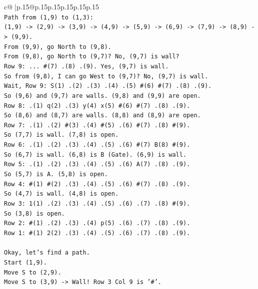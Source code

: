 \documentclass{article}
\begin{document}
{\begin{supertabular}{c@{$\;$}|p{.15\linewidth}@{}p{.15\linewidth}p{.15\linewidth}p{.15\linewidth}p{.15\linewidth}p{.15\linewidth}}
{{{\\ 
\texttt{Path from (1,9) to (1,3):} \\
\texttt{(1,9) {-}> (2,9) {-}> (3,9) {-}> (4,9) {-}> (5,9) {-}> (6,9) {-}> (7,9) {-}> (8,9) {-}> (9,9).} \\
\texttt{From (9,9), go North to (9,8).} \\
\texttt{From (9,8), go North to (9,7)? No, (9,7) is wall?} \\
\texttt{Row 9: ... \#(7) .(8) .(9). Yes, (9,7) is wall.} \\
\texttt{So from (9,8), I can go West to (9,7)? No, (9,7) is wall.} \\
\texttt{Wait, Row 9: S(1) .(2) .(3) .(4) .(5) \#(6) \#(7) .(8) .(9).} \\
\texttt{So (9,6) and (9,7) are walls. (9,8) and (9,9) are open.} \\
\texttt{Row 8: .(1) q(2) .(3) y(4) x(5) \#(6) \#(7) .(8) .(9).} \\
\texttt{So (8,6) and (8,7) are walls. (8,8) and (8,9) are open.} \\
\texttt{Row 7: .(1) .(2) \#(3) .(4) \#(5) .(6) \#(7) .(8) \#(9).} \\
\texttt{So (7,7) is wall. (7,8) is open.} \\
\texttt{Row 6: .(1) .(2) .(3) .(4) .(5) .(6) \#(7) B(8) \#(9).} \\
\texttt{So (6,7) is wall. (6,8) is B (Gate). (6,9) is wall.} \\
\texttt{Row 5: .(1) .(2) .(3) .(4) .(5) .(6) A(7) .(8) .(9).} \\
\texttt{So (5,7) is A. (5,8) is open.} \\
\texttt{Row 4: \#(1) \#(2) .(3) .(4) .(5) .(6) \#(7) .(8) .(9).} \\
\texttt{So (4,7) is wall. (4,8) is open.} \\
\texttt{Row 3: 1(1) .(2) .(3) .(4) .(5) .(6) .(7) .(8) \#(9).} \\
\texttt{So (3,8) is open.} \\
\texttt{Row 2: \#(1) .(2) .(3) .(4) p(5) .(6) .(7) .(8) .(9).} \\
\texttt{Row 1: \#(1) 2(2) .(3) .(4) .(5) .(6) .(7) .(8) .(9).} \\
\\ 
\texttt{Okay, let's find a path.} \\
\texttt{Start (1,9).} \\
\texttt{Move S to (2,9).} \\
\texttt{Move S to (3,9) {-}> Wall! Row 3 Col 9 is '\#'.} \\
}}}
\end{supertabular}}
\end{document}
